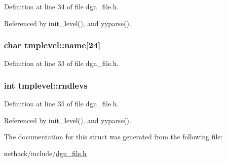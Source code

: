 Definition at line 34 of file dgn\+\_\+file.\+h.



Referenced by init\+\_\+level(), and yyparse().

\hypertarget{structtmplevel_aa6d82e41034f868e4faecb13894a9678}{
\subsubsection[{name}]{\setlength{\rightskip}{0pt plus 5cm}char tmplevel\+::name\mbox{[}24\mbox{]}}}\label{structtmplevel_aa6d82e41034f868e4faecb13894a9678}


Definition at line 33 of file dgn\+\_\+file.\+h.

\hypertarget{structtmplevel_ae2bb5a646ad20b755997afbab6c5d4c7}{
\subsubsection[{rndlevs}]{\setlength{\rightskip}{0pt plus 5cm}int tmplevel\+::rndlevs}}\label{structtmplevel_ae2bb5a646ad20b755997afbab6c5d4c7}


Definition at line 35 of file dgn\+\_\+file.\+h.



Referenced by init\+\_\+level(), and yyparse().



The documentation for this struct was generated from the following file\+:\begin{DoxyCompactItemize}
\item 
nethack/include/\hyperlink{dgn__file_8h}{dgn\+\_\+file.\+h}\end{DoxyCompactItemize}
